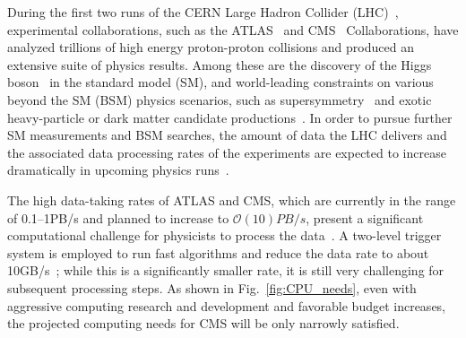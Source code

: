 During the first two runs of the CERN Large Hadron Collider (LHC)~\cite{Evans:2008zzb}, experimental collaborations, such as the ATLAS~\cite{ATLAS:2008xda} and CMS~\cite{CMS:2008xjf} Collaborations, have analyzed trillions of high energy proton-proton collisions and produced an extensive suite of physics results. Among these are the discovery of the Higgs boson~\cite{ATLAS:2012yve,CMS:2012qbp} in the standard model (SM),  and world-leading constraints on various beyond the SM (BSM) physics scenarios, such as supersymmetry~\cite{ATLAS:2021hza, ATLAS:2021twp, ATLAS:2021kxv, CMS:2020fia, CMS:2021edw, CMS:2022vpy} and exotic heavy-particle or dark matter candidate productions~\cite{ATLAS:2022ozf, ATLAS:2021wob, CMS:2022usq, CMS:2022qej}. In order to pursue further SM measurements and BSM searches, the amount of data the LHC delivers and the associated data processing rates of the experiments are expected to increase dramatically in upcoming physics runs~\cite{Bruning:2015dfu}.

The high data-taking rates of ATLAS and CMS, which are currently in the range of 0.1--1\unit{PB/s} and planned to increase to $\mathcal{O}(10)\unit{PB/s}$, present a significant computational challenge for physicists to process the data~\cite{Zabi:2020gjd,2137107}. 
A two-level trigger system is employed to run fast algorithms and reduce the data rate to about 10\unit{GB/s}~\cite{ATLAS:2020esi, CMS:2016ngn}; while this is a significantly smaller rate, it is still very challenging for subsequent processing steps. As shown in Fig.~\ref{fig:CPU_needs}, even with aggressive computing research and development and favorable budget increases, the projected computing needs for CMS will be only narrowly satisfied.

